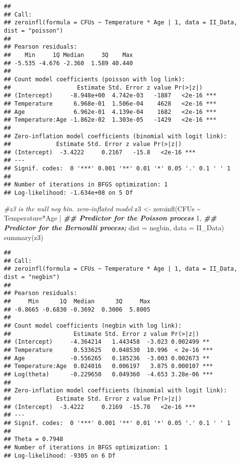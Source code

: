 \documentclass[
]{article}
\newenvironment{Shaded}{\begin{snugshade}}{\end{snugshade}}
\newcommand{\AttributeTok}[1]{\textcolor[rgb]{0.77,0.63,0.00}{#1}}
\newcommand{\CommentTok}[1]{\textcolor[rgb]{0.56,0.35,0.01}{\textit{#1}}}
\newcommand{\DecValTok}[1]{\textcolor[rgb]{0.00,0.00,0.81}{#1}}
\newcommand{\DocumentationTok}[1]{\textcolor[rgb]{0.56,0.35,0.01}{\textbf{\textit{#1}}}}
\newcommand{\FunctionTok}[1]{\textcolor[rgb]{0.00,0.00,0.00}{#1}}
\newcommand{\NormalTok}[1]{#1}
\newcommand{\OtherTok}[1]{\textcolor[rgb]{0.56,0.35,0.01}{#1}}
\newcommand{\SpecialCharTok}[1]{\textcolor[rgb]{0.00,0.00,0.00}{#1}}
\newcommand{\StringTok}[1]{\textcolor[rgb]{0.31,0.60,0.02}{#1}}
\begin{document}
\begin{verbatim}
## 
## Call:
## zeroinfl(formula = CFUs ~ Temperature * Age | 1, data = II_Data, dist = "poisson")
## 
## Pearson residuals:
##    Min     1Q Median     3Q    Max 
## -5.535 -4.676 -2.360  1.589 40.440 
## 
## Count model coefficients (poisson with log link):
##                   Estimate Std. Error z value Pr(>|z|)    
## (Intercept)     -8.948e+00  4.742e-03   -1887   <2e-16 ***
## Temperature      6.968e-01  1.506e-04    4628   <2e-16 ***
## Age              6.962e-01  4.139e-04    1682   <2e-16 ***
## Temperature:Age -1.862e-02  1.303e-05   -1429   <2e-16 ***
## 
## Zero-inflation model coefficients (binomial with logit link):
##             Estimate Std. Error z value Pr(>|z|)    
## (Intercept)  -3.4222     0.2167   -15.8   <2e-16 ***
## ---
## Signif. codes:  0 '***' 0.001 '**' 0.01 '*' 0.05 '.' 0.1 ' ' 1 
## 
## Number of iterations in BFGS optimization: 1 
## Log-likelihood: -1.634e+08 on 5 Df
\end{verbatim}

\begin{Shaded}
\begin{Highlighting}[]
\CommentTok{\#z3 is the null neg bin. zero{-}inflated model}
\NormalTok{z3 }\OtherTok{\textless{}{-}} \FunctionTok{zeroinfl}\NormalTok{(CFUs }\SpecialCharTok{\textasciitilde{}}\NormalTok{ Temperature}\SpecialCharTok{*}\NormalTok{Age }\SpecialCharTok{|} \DocumentationTok{\#\# Predictor for the Poisson process}
                 \DecValTok{1}\NormalTok{, }\DocumentationTok{\#\# Predictor for the Bernoulli process;}
               \AttributeTok{dist =} \StringTok{\textquotesingle{}negbin\textquotesingle{}}\NormalTok{,}
               \AttributeTok{data =}\NormalTok{ II\_Data)}
\FunctionTok{summary}\NormalTok{(z3)}
\end{Highlighting}
\end{Shaded}

\begin{verbatim}
## 
## Call:
## zeroinfl(formula = CFUs ~ Temperature * Age | 1, data = II_Data, dist = "negbin")
## 
## Pearson residuals:
##     Min      1Q  Median      3Q     Max 
## -0.8665 -0.6830 -0.3692  0.3006  5.8005 
## 
## Count model coefficients (negbin with log link):
##                  Estimate Std. Error z value Pr(>|z|)    
## (Intercept)     -4.364214   1.443458  -3.023 0.002499 ** 
## Temperature      0.533625   0.048530  10.996  < 2e-16 ***
## Age             -0.556265   0.185236  -3.003 0.002673 ** 
## Temperature:Age  0.024016   0.006197   3.875 0.000107 ***
## Log(theta)      -0.229650   0.049360  -4.653 3.28e-06 ***
## 
## Zero-inflation model coefficients (binomial with logit link):
##             Estimate Std. Error z value Pr(>|z|)    
## (Intercept)  -3.4222     0.2169  -15.78   <2e-16 ***
## ---
## Signif. codes:  0 '***' 0.001 '**' 0.01 '*' 0.05 '.' 0.1 ' ' 1 
## 
## Theta = 0.7948 
## Number of iterations in BFGS optimization: 1 
## Log-likelihood: -9305 on 6 Df
\end{verbatim}
\end{document}
